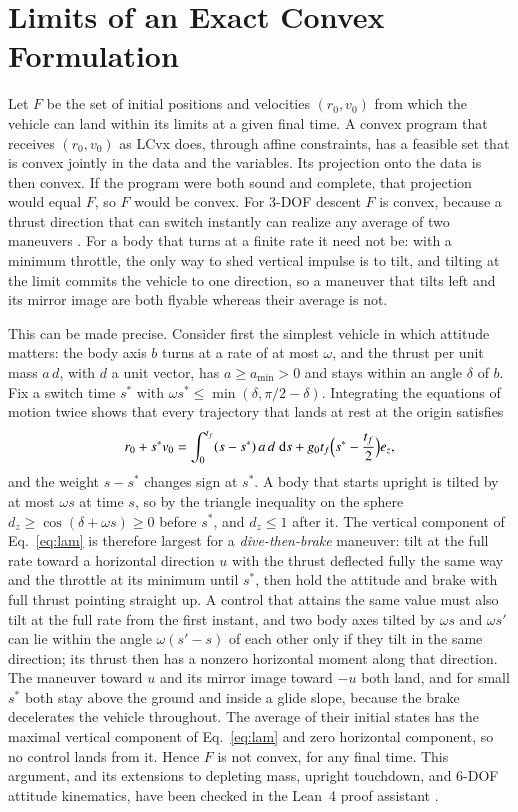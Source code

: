 \section{Limits of an Exact Convex Formulation}\label{sec:imposs}
Let $F$ be the set of initial positions and velocities $(r_0,v_0)$ from which the vehicle can land within its limits at a given
final time. A convex program that receives $(r_0,v_0)$ as LCvx does, through affine constraints, has a feasible set that is
convex jointly in the data and the variables. Its projection onto the data is then convex. If the program were both sound and
complete, that projection would equal $F$, so $F$ would be convex. For 3-DOF descent $F$ is convex, because a thrust direction
that can switch instantly can realize any average of two maneuvers \cite{aumann1965}. For a body that turns at a finite rate it
need not be: with a minimum throttle, the only way to shed vertical impulse is to tilt, and tilting at the limit commits the vehicle
to one direction, so a maneuver that tilts left and its mirror image are both flyable whereas their average is not.

This can be made precise. Consider first the simplest vehicle in which attitude matters: the body axis $b$ turns at a rate
of at most $\omega$, and the thrust per unit mass $a\,d$, with $d$ a unit vector, has $a\ge a_{\min}>0$ and stays within an
angle $\delta$ of $b$. Fix a switch time $s^*$ with $\omega s^*\le\min(\delta,\pi/2-\delta)$. Integrating the equations of
motion twice shows that every trajectory that lands at rest at the origin satisfies
\begin{equation}\label{eq:lam}
r_0+s^*v_0=\int_0^{t_f}(s-s^*)\,a\,d\;\mathrm ds+g_0t_f\Bigl(s^*-\frac{t_f}{2}\Bigr)e_z ,
\end{equation}
and the weight $s-s^*$ changes sign at $s^*$. A body that starts upright is tilted by at most $\omega s$ at time $s$, so by
the triangle inequality on the sphere $d_z\ge\cos(\delta+\omega s)\ge0$ before $s^*$, and $d_z\le1$ after it. The vertical
component of Eq.~\eqref{eq:lam} is therefore largest for a \emph{dive-then-brake} maneuver: tilt at the full rate toward a
horizontal direction $u$ with the thrust deflected fully the same way and the throttle at its minimum until $s^*$, then hold
the attitude and brake with full thrust pointing straight up. A control that attains the same value must also tilt at the
full rate from the first instant, and two body axes tilted by $\omega s$ and $\omega s'$ can lie within the angle
$\omega(s'-s)$ of each other only if they tilt in the same direction; its thrust then has a nonzero horizontal moment along
that direction. The maneuver toward $u$ and its mirror image toward $-u$ both land, and for small $s^*$ both stay above the
ground and inside a glide slope, because the brake decelerates the vehicle throughout. The average of their initial states
has the maximal vertical component of Eq.~\eqref{eq:lam} and zero horizontal component, so no control lands from it. Hence
$F$ is not convex, for any final time. This argument, and its extensions to depleting mass, upright touchdown, and 6-DOF
attitude kinematics, have been checked in the Lean~4 proof assistant \cite{lean4,mathlib,repo}.

